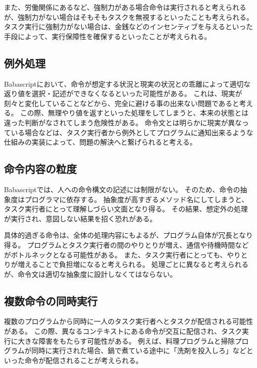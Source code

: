 \documentclass[twoside]{wiss}
\begin{document}
また、労働関係にあるなど、強制力がある場合命令は実行されると考えられるが、強制力がない場合はそもそもタスクを無視するといったことも考えられる。
タスク実行に強制力がない場合は、金銭などのインセンティブを与えるといった手段によって、実行保障性を確保するといったことが考えられる。

\subsection{例外処理}

Babascriptにおいて、命令が想定する状況と現実の状況との乖離によって適切な返り値を選択・記述ができなくなるといった可能性がある。
これは、現実が刻々と変化していることなどから、完全に避ける事の出来ない問題であると考える。
この際、無理やり値を返すといった処理をしてしまうと、本来の状態とは違った判断がなされてしまう危険性がある。
命令文とは明らかに現実が異なっている場合などは、タスク実行者から例外としてプログラムに通知出来るような仕組みの実装によって、問題の解決へと繋げられると考える。

\subsection{命令内容の粒度}

Babascriptでは、人への命令構文の記述には制限がない。
そのため、命令の抽象度はプログラマに依存する。
抽象度が高すぎるメソッド名にしてしまうと、タスク実行者にとって理解しづらい文面となり得る。
その結果、想定外の処理が実行され、意図しない結果を招く恐れがある。

具体的過ぎる命令は、全体の処理内容にもよるが、プログラム自体が冗長となり得る。
プログラムとタスク実行者の間のやりとりが増え、通信や待機時間などがボトルネックとなる可能性がある。
また、タスク実行者にとっても、やりとりが増えることで負担増になると考えられる。
処理ごとに異なると考えられるが、命令文は適切な抽象度に設計しなくてはならない。


\subsection{複数命令の同時実行}

複数のプログラムから同時に一人のタスク実行者へとタスクが配信される可能性がある。
この際、異なるコンテキストにある命令が交互に配信され、タスク実行に大きな障害をもたらす可能性がある。
例えば、料理プログラムと掃除プログラムが同時に実行された場合、鍋で煮ている途中に「洗剤を投入しろ」などといった命令が配信されることが考えられる。
\end{document}
